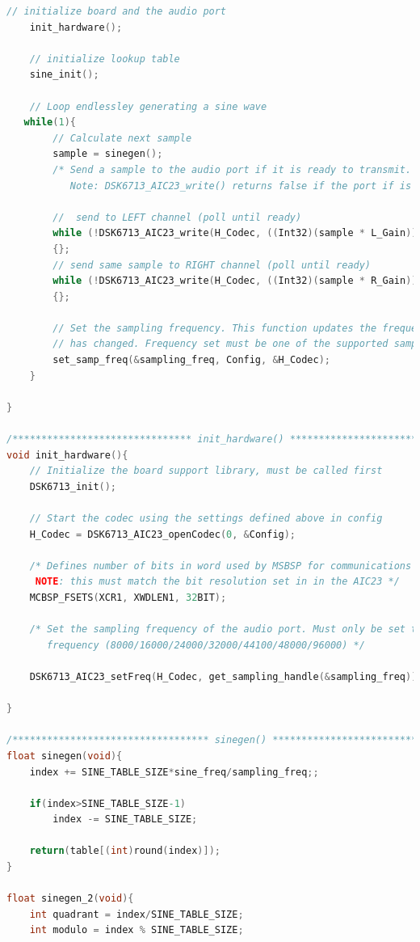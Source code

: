 \documentclass{article}
\begin{document}
\begin{lstlisting}[language=C, caption=Full Code Listing]
	// initialize board and the audio port
	init_hardware();
	
	// initialize lookup table
	sine_init();
	
    // Loop endlessley generating a sine wave 
   while(1){
 		// Calculate next sample
 		sample = sinegen();
     	/* Send a sample to the audio port if it is ready to transmit.
           Note: DSK6713_AIC23_write() returns false if the port if is not ready */

        //  send to LEFT channel (poll until ready)
        while (!DSK6713_AIC23_write(H_Codec, ((Int32)(sample * L_Gain))))
        {};
		// send same sample to RIGHT channel (poll until ready)
        while (!DSK6713_AIC23_write(H_Codec, ((Int32)(sample * R_Gain))))
        {};
        
		// Set the sampling frequency. This function updates the frequency only if it 
		// has changed. Frequency set must be one of the supported sampling freq.
		set_samp_freq(&sampling_freq, Config, &H_Codec);	
	}

}

/******************************* init_hardware() ************************************/
void init_hardware(){
    // Initialize the board support library, must be called first 
    DSK6713_init();
    
    // Start the codec using the settings defined above in config 
    H_Codec = DSK6713_AIC23_openCodec(0, &Config);

	/* Defines number of bits in word used by MSBSP for communications with AIC23
	 NOTE: this must match the bit resolution set in in the AIC23 */
	MCBSP_FSETS(XCR1, XWDLEN1, 32BIT);
	
	/* Set the sampling frequency of the audio port. Must only be set to a supported 
	   frequency (8000/16000/24000/32000/44100/48000/96000) */
	
	DSK6713_AIC23_setFreq(H_Codec, get_sampling_handle(&sampling_freq));

}

/********************************** sinegen() ***************************************/   
float sinegen(void){
	index += SINE_TABLE_SIZE*sine_freq/sampling_freq;;

	if(index>SINE_TABLE_SIZE-1)
		index -= SINE_TABLE_SIZE;
		
    return(table[(int)round(index)]);
}

float sinegen_2(void){
    int quadrant = index/SINE_TABLE_SIZE;
    int modulo = index % SINE_TABLE_SIZE;
    

\end{lstlisting}
\end{document}
